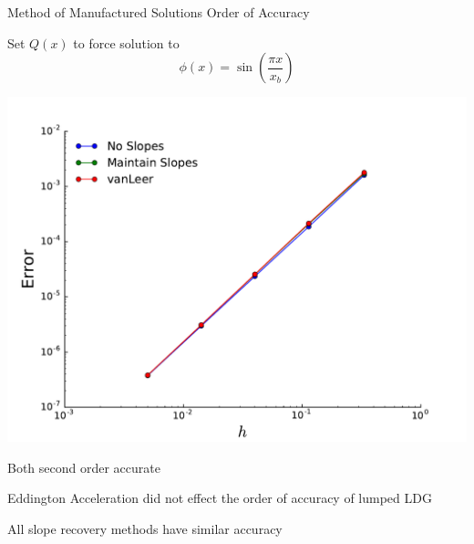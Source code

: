 \documentclass[10pt]{beamer}
\begin{document}
\begin{frame}{Method of Manufactured Solutions Order of Accuracy} 

	\footnotesize
	Set $Q(x)$ to force solution to 
	\begin{equation*}
		\phi(x) = \sin\left(\frac{\pi x}{x_b}\right)
	\end{equation*}

	\pause
	\centerline{\includegraphics[width=.5\paperwidth]{figs/ooa.pdf}}

	\pause
	Both second order accurate

	\pause
	Eddington Acceleration did not effect the order of accuracy of lumped LDG 

	\pause 
	All slope recovery methods have similar accuracy 

\end{frame}
\end{document}
